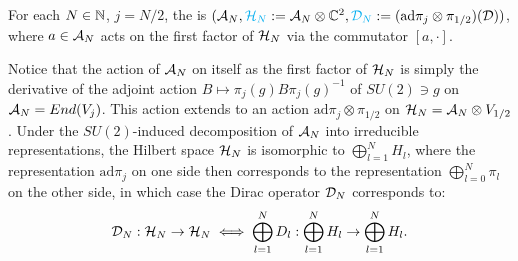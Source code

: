     
    
    



\linea

\begin{definition}
For each $N \in \mathbb{N}$, $j = N/2$, the  is $(\mathcal A_N, \textcolor{cyan}{\mathcal H_N} := \mathcal A_N \otimes \mathbb{C}^2, \textcolor{cyan}{\mathcal D_N} := (\text{ad}\pi_j \otimes \pi_{1/2})(\mathcal D) )$, where $a \in \mathcal A_N$ acts on the first factor of $\mathcal H_N$ via the commutator $[a, \cdot]$.
\end{definition}

Notice that the action of $\mathcal A_N$ on itself as the first factor of $\mathcal H_N$ is simply the derivative of the adjoint action $B \mapsto \pi_j(g) B \pi_j(g)^{-1}$ of $SU(2) \ni g$ on $\mathcal A_N = End(V_j)$. This action extends to an action $\text{ad}\pi_j \otimes \pi_{1/2}$ on $\mathcal H_N = \mathcal A_N \otimes V_{1/2}$. Under the $SU(2)$-induced decomposition of $\mathcal A_N$ into irreducible representations, the Hilbert space $\mathcal H_N$ is isomorphic to $\bigoplus_{l =1}^N H_l$, where the representation $\text{ad}\pi_j$ on one side then corresponds to the representation $\bigoplus_{l = 0}^N \pi_l$ on the other side, in which case the Dirac operator $\mathcal D_N$ corresponds to:
\begin{equation}\label{reducibleDiracDecomposition}
    \mathcal D_N : \mathcal H_N \to \mathcal H_N  \iff \bigoplus_{l =1}^N D_l: \bigoplus_{l =1}^N H_l \to \bigoplus_{l =1}^N H_l.
\end{equation}

